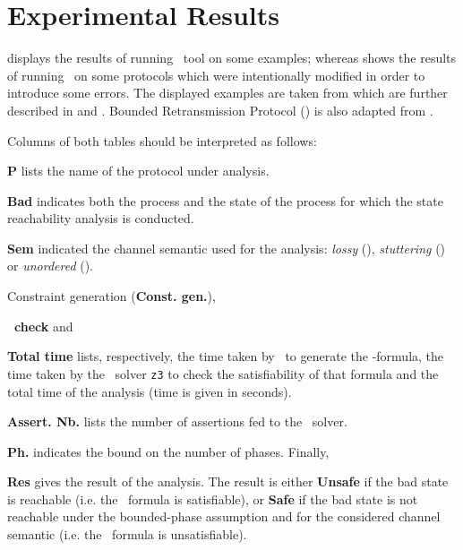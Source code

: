 \section{Experimental Results}

 displays the results of running \MPass\ tool on  some examples;
whereas  shows the results of running \MPass\ on some protocols which were intentionally modified in order to introduce some errors.
%
The displayed  examples are taken from \cite{JRSVgit}  which are further described in \cite{MPSV11} and \cite{RSV11}.
%
Bounded Retransmission Protocol (\Brp) is also adapted from \cite{AABJ04}.


Columns of both tables should be interpreted as follows:
%
\begin{inparaenum}
\item {\bf P} lists the name of the protocol under analysis.
\item {\bf Bad} indicates both the process and the state of the process for which the state reachability analysis is conducted.
\item {\bf Sem} indicated the channel semantic used for the analysis: \textit{lossy} (\Lcs), \textit{stuttering} (\Slcs) or \textit{unordered} (\Ucs).
\item Constraint generation (\textbf{Const. gen.}),
\item \textbf{\Smt\ check} and
\item {\bf Total time} lists, respectively, the time taken by \MPass\ to generate  the \Smt-formula,
the time taken by the \Smt\ solver \texttt{z3} to check the satisfiability of that formula and the total time of the analysis
(time is given in seconds).
\item {\bf Assert. Nb.} lists the number of assertions fed to the \Smt\ solver.
\item {\bf Ph.} indicates the bound on the number of phases. Finally,
\item {\bf Res} gives the result of the analysis. The result is either \textbf{Unsafe} if the bad state is reachable (i.e. the \Smt\ formula is satisfiable), or
\textbf{Safe}  if the bad state is not reachable under the bounded-phase assumption and for the considered channel semantic
(i.e. the \Smt\ formula is unsatisfiable).
\end{inparaenum}

